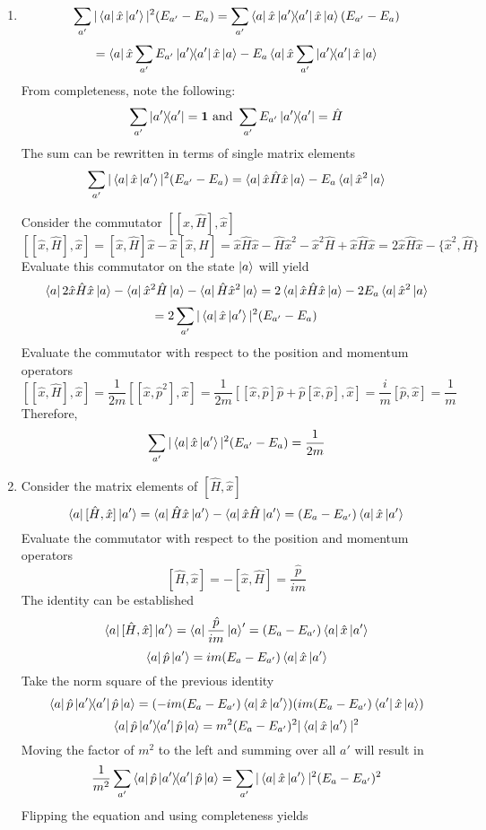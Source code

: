 \begin{sol}
\begin{enumerate}[label=\textbf{(\alph*)}]
\item

$$\sum_{a'}|\bra a\hat x\ket{a'}|^2(E_{a'}-E_a)=\sum_{a'}\bra a\hat x\ketbra {a'}{a'}\hat x\ket{a}(E_{a'}-E_a)$$
$$=\bra a\hat x\sum_{a'}E_{a'}\ketbra{a'}{a'}\hat x\ket a-E_{a}\bra a\hat x\sum_{a'}\ketbra{a'}{a'}\hat x\ket a$$
From completeness, note the following:
$$\sum_{a'}\ketbra{a'}{a'}=\mathbf{1}\text{ and }\sum_{a'}E_{a'}\ketbra{a'}{a'}=\hat H$$ 
The sum can be rewritten in terms of single matrix elements
$$\sum_{a'}|\bra a\hat x\ket{a'}|^2(E_{a'}-E_a)=\bra a\hat x\hat H\hat x\ket a-E_a\bra a\hat x^2\ket a$$

Consider the commutator $[[\hat x,\hat H],\hat x]$
$$[[\hat x,\hat H],\hat x]=[\hat x,\hat H]\hat x-\hat x[\hat x,\hat H]=\hat x\hat H\hat x-\hat H\hat x^2-\hat x^2\hat H+\hat x\hat H\hat x=2\hat x\hat H\hat x-\{\hat x^2,\hat H\}$$ 
Evaluate this commutator on the state $\ket a$ will yield
$$\bra a 2\hat x\hat H\hat x\ket a-\bra a\hat x^2\hat H\ket a-\bra a\hat H\hat x^2\ket a=2\bra a \hat x\hat H\hat x\ket a-2E_a\bra a\hat x^2\ket a$$
$$=2\sum_{a'}|\bra a\hat x\ket{a'}|^2(E_{a'}-E_a)$$ 
Evaluate the commutator with respect to the position and momentum operators
$$[[\hat x,\hat H],\hat x]=\frac{1}{2m}[[\hat x,\hat p^2],\hat x]=\frac{1}{2m}[[\hat x,\hat p]\hat p+\hat p[\hat x,\hat p],\hat x]=\frac{i}{m}[\hat p,\hat x]=\frac{1}{m}$$   
Therefore,
$$\sum_{a'}|\bra a\hat x\ket{a'}|^2(E_{a'}-E_a)=\frac{1}{2m}$$
\item
Consider the matrix elements of $[\hat H,\hat x]$
$$\bra a[\hat H,\hat x]\ket {a'}=\bra a\hat H\hat x\ket{a'}-\bra a\hat x\hat H\ket {a'}=(E_a-E_{a'})\bra a\hat x\ket {a'}$$ 
Evaluate the commutator with respect to the position and momentum operators
$$[\hat H,\hat x]=-[\hat x,\hat H]=\frac{\hat p}{im}$$
The identity can be established
$$\bra a[\hat H,\hat x]\ket {a'}=\bra a\frac{\hat p}{im}\ket a'=(E_a-E_{a'})\bra a\hat x\ket {a'}$$
$$\bra a\hat p\ket {a'}=im(E_a-E_{a'})\bra a\hat x\ket{a'}$$ 
Take the norm square of the previous identity
$$\bra a\hat p\ketbra{a'}\hat p\ket a=(-im(E_a-E_{a'})\bra a\hat x\ket{a'})(im(E_a-E_{a'})\bra {a'}\hat x\ket{a})$$
$$\bra a\hat p\ketbra{a'}\hat p\ket a=m^2(E_a-E_{a'})^2|\bra a\hat x\ket{a'}|^2$$ 
Moving the factor of $m^2$ to the left and summing over all $a'$ will result in
$$\frac{1}{m^2}\sum_{a'}\bra a\hat p\ketbra{a'}\hat p\ket a=\sum_{a'}|\bra a\hat x\ket{a'}|^2(E_a-E_{a'})^2$$ 
Flipping the equation and using completeness yields

\end{enumerate}
\end{sol}
